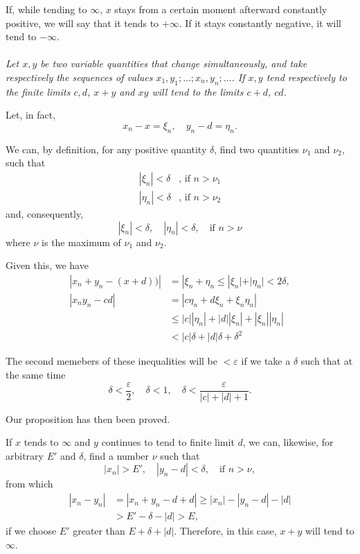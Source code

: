 \documentclass[10pt,letterpaper]{book}
\renewcommand\epsilon{\varepsilon}
\theoremstyle{definition}
\begin{document}
If, while tending to $\infty$, $x$ stays from a certain moment afterward constantly positive, we will say that it tends to $+\infty$. If it stays constantly negative, it will tend to $-\infty$.

\paragraph{} \textit{Let $x, y$ be two variable quantities that change simultaneously, and take respectively the sequences of values $x_1, y_1;\dots;x_n,y_n;\dots$. If $x, y$ tend respectively to 
the finite limits $c, d$, $x+y$ and $xy$ will tend to the limits $c+d$, $cd$.}

Let, in fact,
\[
  x_n-x=\xi_n,\quad y_n-d=\eta_n.
\]

We can, by definition, for any positive quantity $\delta$, find two quantities $\nu_1$ and $\nu_2$, such that
\begin{align*}
  |\xi_n|<\delta &\mbox{, if } n>\nu_1\\
  |\eta_n|<\delta &\mbox{, if } n>\nu_2
\end{align*}
and, consequently,
\[
  |\xi_n|<\delta,\quad|\eta_n|<\delta,\quad\mbox{if }n>\nu
\]
where $\nu$ is the maximum of $\nu_1$ and $\nu_2$.

Given this, we have
\begin{align*}
  |x_n+y_n-(x+d))| 
    &= |\xi_n+\eta_n\leq |\xi_n|+|\eta_n| < 2\delta,\\
  |x_ny_n-cd| &= |c\eta_n+d\xi_n+\xi_n\eta_n|\\
    &\leq |c||\eta_n|+|d||\xi_n| + |\xi_n||\eta_n|\\
    &<|c|\delta + |d|\delta + \delta^2
\end{align*}

The second memebers of these inequalities will be $<\epsilon$ if we take a $\delta$ such that at the same time
\[
  \delta <\frac\epsilon 2,\quad
    \delta < 1,\quad
    \delta < \frac{\epsilon}{|c|+|d|+1}.
\]

Our proposition has then been proved.

If $x$ tends to $\infty$ and $y$ continues to tend to finite limit $d$, we can, likewise, for arbitrary $E'$ and $\delta$, find a number $\nu$ such that
\[
  |x_n|>E',\quad
    |y_n-d|<\delta,\quad
    \mbox{if }n>\nu,
\]
from which
\begin{align*}
  |x_n-y_n| &= 
    |x_n+y_n-d+d|\geq
    |x_n| - |y_n-d| - |d|\\
    &> E'-\delta-|d| > E,
\end{align*}
if we choose $E'$ greater than $E+\delta+|d|$. Therefore, in this case, $x+y$ will tend to $\infty$.
\end{document}
